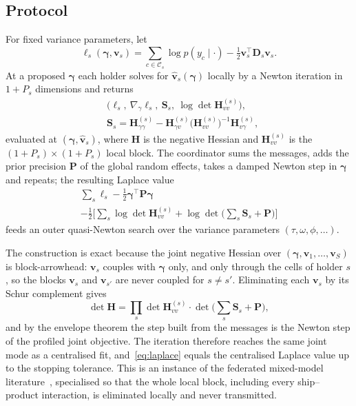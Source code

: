 \subsection{Protocol}
For fixed variance parameters, let
\begin{equation}
\ell_s(\boldsymbol\gamma,\mathbf v_s)=\sum_{c\in\mathcal C_s}\log p(y_c\mid\cdot)
-\tfrac12\mathbf v_s^{\top}\mathbf D_s\mathbf v_s .
\end{equation}
At a proposed $\boldsymbol\gamma$ each holder solves for
$\hat{\mathbf v}_s(\boldsymbol\gamma)$ locally by a Newton iteration in
$1+P_s$ dimensions and returns
\begin{equation}
\begin{aligned}
&\big(\ell_s,\ \nabla_{\gamma}\ell_s,\ \mathbf S_s,\
\log\det\mathbf H_{vv}^{(s)}\big),\\
&\mathbf S_s=\mathbf H_{\gamma\gamma}^{(s)}-\mathbf H_{\gamma v}^{(s)}
\big(\mathbf H_{vv}^{(s)}\big)^{-1}\mathbf H_{v\gamma}^{(s)},
\end{aligned}
\label{eq:message}
\end{equation}
evaluated at $(\boldsymbol\gamma,\hat{\mathbf v}_s)$, where $\mathbf H$ is the
negative Hessian and $\mathbf H_{vv}^{(s)}$ is the $(1+P_s)\times(1+P_s)$ local
block. The coordinator sums the messages, adds the prior precision $\mathbf P$ of
the global random effects, takes a damped Newton step in $\boldsymbol\gamma$ and
repeats; the resulting Laplace value
\begin{multline}
\sum_s\ell_s-\tfrac12\boldsymbol\gamma^{\top}\mathbf P\boldsymbol\gamma\\
-\tfrac12\Big[\sum_s\log\det\mathbf H_{vv}^{(s)}
+\log\det\big(\textstyle\sum_s\mathbf S_s+\mathbf P\big)\Big]
\label{eq:laplace}
\end{multline}
feeds an outer quasi-Newton search over the variance parameters
$(\tau,\omega,\phi,\dots)$.

The construction is exact because the joint negative
Hessian over $(\boldsymbol\gamma,\mathbf v_1,\dots,\mathbf v_S)$ is
block-arrowhead: $\mathbf v_s$ couples with $\boldsymbol\gamma$ only, and only
through the cells of holder $s$, so the blocks $\mathbf v_s$ and
$\mathbf v_{s'}$ are never coupled for $s\ne s'$. Eliminating each
$\mathbf v_s$ by its Schur complement gives
\begin{equation}
\det\mathbf H=\prod_s\det\mathbf H_{vv}^{(s)}\cdot
\det\Big(\textstyle\sum_s\mathbf S_s+\mathbf P\Big),
\end{equation}
and by the envelope theorem the step built from the messages is the Newton step
of the profiled joint objective. The iteration therefore reaches the same joint
mode as a centralised fit, and~\eqref{eq:laplace} equals the centralised Laplace
value up to the stopping tolerance. This is an instance of the federated
mixed-model literature~\cite{li2022fedglmm,luo2022dpql}, specialised so that the
whole local block, including every ship--product interaction, is eliminated
locally and never transmitted.


